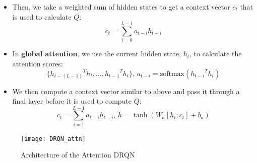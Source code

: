 \documentclass[final]{beamer}
\newlength{\onecolwid}
\newlength{\twocolwid}
\begin{document}
\begin{frame}[t]
\begin{columns}[t]
\begin{column}{\twocolwid}
\begin{columns}[t,totalwidth=\twocolwid]
\begin{column}{\onecolwid}
\begin{itemize}
        \item Then, we take a weighted sum of hidden states to get a context
            vector $c_t$ that is used to calculate $Q$:
            $$c_t = \sum_{i=0}^{L-1}a_{t-i}h_{t-i}$$
        \item In \textbf{global attention}, we use the current hidden state, $h_t$,
            to calculate the attention scores:
            $$\{{h_{t-(L-1)}}^Th_t, \dots, {h_{t-1}}^Th_t\} \text{, }
              a_{t-i} = \text{softmax}({h_{t-i}}^Th_t)$$
        \item We then compute a context vector similar to above and pass it through
            a final layer before it is used to compute $Q$:
            $$c_t = \sum_{i=1}^{L-1}a_{t-i}h_{t-i} \text{, }
              \tilde{h} = \tanh(W_a[h_t;c_t] + b_a)$$
\end{itemize}

\begin{figure}[h]
    \centering
    \texttt{[image: DRQN\_attn]}
    \caption{Architecture of the Attention DRQN}
\end{figure}


\end{column} %

\end{columns} %


\begin{column}{\twocolwid}


\end{column}
\end{column}
\end{columns}
\end{frame}
\end{document}
